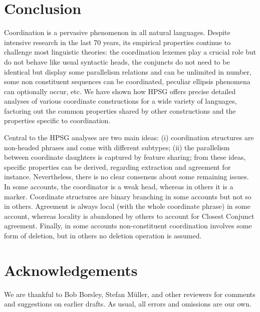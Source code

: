 \documentclass[output=paper
                ,modfonts
                ,nonflat
	        ,collection
	        ,collectionchapter
	        ,collectiontoclongg
 	        ,biblatex
                ,babelshorthands
                ,newtxmath
                ,draftmode
                ,colorlinks, citecolor=brown
]{./langsci/langscibook}
\begin{document}
\section{Conclusion}

Coordination is a pervasive phenomenon in all natural languages. Despite intensive research in the last 70 years, its empirical properties continue to challenge most linguistic theories:  the coordination lexemes play a crucial role but do not behave like usual syntactic heads, the conjuncts do not need to be identical but display some parallelism relations and can be unlimited in number, some non constituent sequences can be coordinated, peculiar ellipsis phenomena can optionally occur,  etc. We have shown how HPSG offers precise detailed analyses of various coordinate constructions for a wide variety of languages, factoring out the common properties shared by other constructions and the properties specific to coordination.

Central to the HPSG analyses are two main ideas: (i) coordination structures are non-headed phrases and come with different subtypes; (ii) the parallelism between coordinate daughters is captured by feature sharing; from these ideas, specific properties can be derived, regarding extraction and agreement for instance. Nevertheless, there is no clear consensus about some remaining issues. In some accounts, the coordinator is a weak head, whereas in others it is a marker. Coordinate structures are binary branching in some accounts but not so in others. Agreement is always local (with the whole coordinate phrase) in some account, whereas locality is abandoned by others to account for Closest Conjunct agreement. Finally, in some accounts non-constituent coordination involves some form of deletion, but in others no deletion operation is assumed.

 
\section*{Acknowledgements}

We are thankful to Bob Borsley, Stefan M\"{u}ller, and other reviewers for comments and suggestions on earlier drafts. 
As usual, all errors and omissions are our own.


{\sloppy
\printbibliography[heading=subbibliography,notkeyword=this] 
}
\end{document}
